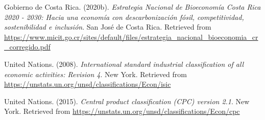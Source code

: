 \documentclass[
  letterpaper,
  DIV=11,
  numbers=noendperiod]{scrartcl}
\newlength{\cslhangindent}
\newenvironment{CSLReferences}[2] %
 {\begin{list}{}{%
  \setlength{\itemindent}{0pt}
  \setlength{\leftmargin}{0pt}
  \setlength{\parsep}{0pt}
  \ifodd #1
   \setlength{\leftmargin}{\cslhangindent}
   \setlength{\itemindent}{-1\cslhangindent}
  \fi
  \setlength{\itemsep}{#2\baselineskip}}}
 {\end{list}}
\begin{document}
\begin{CSLReferences}{1}{0}
Gobierno de Costa Rica. (2020b). \emph{Estrategia {Nacional} de
{Bioeconomía Costa Rica} 2020 - 2030: {Hacia} una economía con
descarbonización fósil, competitividad, sostenibilidad e inclusión}. San
José de Costa Rica. Retrieved from
\url{https://www.micit.go.cr/sites/default/files/estrategia_nacional_bioeconomia_cr_corregido.pdf}

United Nations. (2008). \emph{International standard industrial
classification of all economic activities: Revision 4}. New York.
Retrieved from
\url{https://unstats.un.org/unsd/classifications/Econ/isic}

United Nations. (2015). \emph{Central product classification (CPC)
version 2.1}. New York. Retrieved from
\url{https://unstats.un.org/unsd/classifications/Econ/cpc}

\end{CSLReferences}
\end{document}
